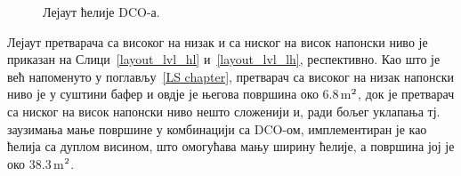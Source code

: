 \documentclass[master]{finthesis}
\def \DCO  {DCO} %
\begin{document}
\begin{figure}[!ht]
	 \centering
	\caption{Лејаут ћелије \DCO-а.}
	\label{layout_dco_cell}
\end{figure}
Лејаут претварача са високог на низак и са ниског на висок напонски ниво је приказан на Слици~\ref{layout_lvl_hl} и~\ref{layout_lvl_lh}, респективно. Као што је већ напоменуто у поглављу~\ref{LS chapter}, претварач са високог на низак напонски ниво је у суштини бафер и овдје је његова површина око 6.8\,\text\textmu m$^\text2$, док је претварач са ниског на висок напонски ниво нешто сложенији и, ради бољег уклапања тј. заузимања мање површине у комбинацији са \DCO-ом, имплементиран је као ћелија са дуплом висином, што омогућава мању ширину ћелије, а површина јој је око 38.3\,\text\textmu m$^\text2$. \par 
\end{document}
